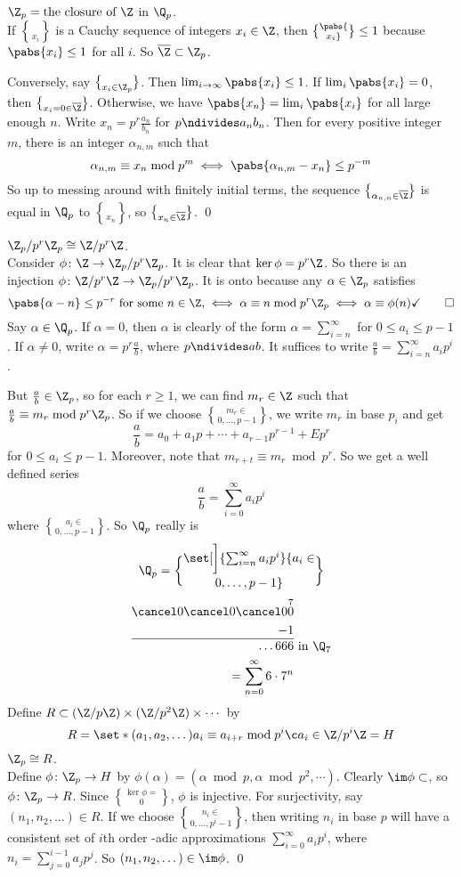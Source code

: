 \thm $\Z_p=\text{the closure of $\Z$}$ in $\Q_p$. \\
\pf If $\brace{x_i}$ is a Cauchy sequence of integers $x_i\in\Z$, then $\pabs{\brace{x_i}}\leq1$ because $\pabs{x_i}\leq1$ for all $i$.  So $\overline\Z\subset\Z_p$.

Conversely, say $\brace{x_i}\in\Z_p$.  Then $\lim_{i\to\infty}\pabs{x_i}\leq1$.  If $\lim_i\pabs{x_i}=0$, then $\brace{x_i}=0\in\overline\Z$.  Otherwise, we have $\pabs{x_n}=\lim_i\pabs{x_i}$ for all large enough $n$.  Write $x_n=p^r\frac{a_n}{b_n}$ for $p\ndivides a_nb_n$.  Then for every positive integer $m$, there is an integer $\alpha_{n,m}$ such that
\[ \alpha_{n,m}\equiv x_n\bmod p^m \iff \pabs{\alpha_{n,m}-x_n}\leq p^{-m} \]
So up to messing around with finitely initial terms, the sequence $\brace{\alpha_{n,n}}\in\overline\Z$ is equal in $\Q_p$ to $\brace{x_n}$, so $\brace{x_n}\in\overline\Z$. \qed

\thm $\Z_p/p^r\Z_p\cong\Z/p^r\Z$. \\
\pf Consider $\phi\colon\Z\to\Z_p/p^r\Z_p$.  It is clear that $\ker\phi=p^r\Z$.  So there is an injection $\phi\colon\Z/p^r\Z\to\Z_p/p^r\Z_p$.  It is onto because any $\alpha\in\Z_p$ satisfies 
\[ \pabs{\alpha-n}\leq p^{-r} \text{ for some $n\in\Z$,} \iff \alpha\equiv n\bmod p^r\Z_p \iff \alpha\equiv\phi(n) \checkmark \qed \]
Say $\alpha\in\Q_p$.  If $\alpha=0$, then $\alpha$ is clearly of the form $\alpha=\sum_{i=n}^\infty$ for $0\leq a_i\leq p-1$.  If $\alpha\neq0$, write $\alpha=p^r\frac{a}{b}$, where $p\ndivides ab$.  It suffices to write $\frac ab=\sum_{i=n}^\infty a_ip^i$.

But $\frac ab\in\Z_p$, so for each $r\geq1$, we can find $m_r\in\Z$ such that $\frac ab\equiv m_r\bmod p^r\Z_p$.  So if we choose $m_r\in\brace{0,\dotsc,p-1}$, we write $m_r$ in base $p_i$ and get
\[ \frac ab = a_0 + a_1 p + \dotsb + a_{r-1} p^{r-1} + E p^r \]
for $0\leq a_i\leq p-1$.  Moreover, note that $m_{r+t}\equiv m_r\bmod p^r$.  So we get a well defined series
\[ \frac ab = \sum_{i=0}^\infty a_i p^i \]
where $a_i\in\brace{0,\dotsc,p-1}$.  So $\Q_p$ really is
\[ \Q_p = \set[\bigg]{\sum_{i=n}^\infty a_ip^i}{a_i\in\brace{0,\dotsc,p-1}} \]
\[ \begin{aligned}
{\cancel0} {\cancel0} {\cancel0} \overset{7}{0} \\
-1 \\ \hline
\ldots666 \\
=\sum_{n=0}^\infty 6\cdot 7^n
\end{aligned} \text{ in $\Q_7$} \]
Define $R\subset(\Z/p\Z)\times(\Z/p^2\Z)\times\dotsb$ by
\[ R = \set*{(a_1,a_2,\dotsc)}{a_i\equiv a_{i+r}\bmod p^i\c a_i\in\Z/p^i\Z} = H \]
\thm $\Z_p\cong R$. \\
\pf Define $\phi\colon\Z_p\to H$ by $\phi(\alpha)=(\alpha\bmod p,\alpha\bmod p^2,\dotsb)$.  Clearly $\im\phi\subset$, so $\phi\colon\Z_p\to R$.  Since $\ker\phi=\brace0$, $\phi$ is injective.  For surjectivity, say $(n_1,n_2,\dotsc)\in R$.  If we choose $n_i\in\brace{0,\dotsc,p^i-1}$, then writing $n_i$ in base $p$ will have a consistent set of $i$th order \p-adic approximations $\sum_{i=0}^\infty a_i p^i$, where $n_i=\sum_{j=0}^{i-1} a_j p^j$.  So $(n_1,n_2,\dotsc)\in\im\phi$. \qed
